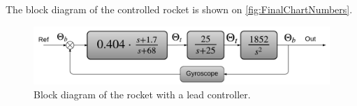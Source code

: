 %

%

The block diagram of the controlled rocket is shown on  \autoref{fig:FinalChartNumbers}.


\begin{figure}[htbp]
	\centerline{
	\includegraphics[width=1\textwidth]{figures/Rocket/design/FinalBlockRocket}}
	\caption{Block diagram of the rocket with a lead controller.}
	\label{fig:FinalChartNumbers}
\end{figure}
